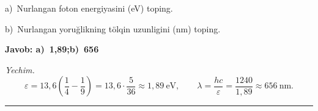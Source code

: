 \documentclass[11pt,a4paper]{article}
\begin{document}
\noindent\hspace*{4mm}a)\ Nurlangan foton energiyasini (eV) toping.\par
\noindent\hspace*{4mm}b)\ Nurlangan yoruğlikning tölqin uzunligini (nm) toping.\par
\noindent\colorbox{gray!12}{\parbox{\dimexpr\linewidth-2\fboxsep}{\textbf{Javob: a)\ 1,89;\quad b)\ 656}}}\par\smallskip
\noindent\textit{Yechim.}\ \[\varepsilon=13{,}6\left(\frac14-\frac19\right)=13{,}6\cdot\frac{5}{36}\approx1{,}89\ \text{eV},\qquad \lambda=\frac{hc}{\varepsilon}=\frac{1240}{1{,}89}\approx656\ \text{nm}.\]\par\medskip\hrule\medskip
\end{document}
